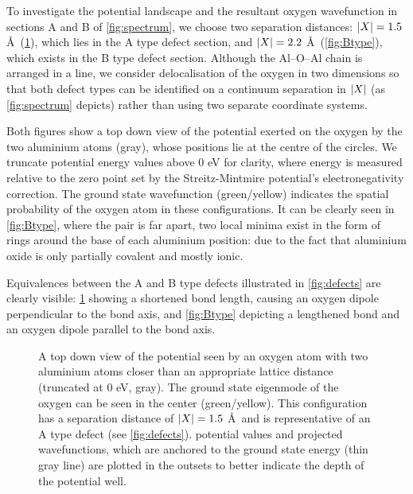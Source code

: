 To investigate the potential landscape and the resultant oxygen wavefunction in sections A and B of \cref{fig:spectrum}, we choose two separation distances: $\lvert X\rvert = 1.5$ \AA\ (\cref{fig:Atype}), which lies in the A type defect section, and $\lvert X\rvert = 2.2$ \AA\ (\cref{fig:Btype}), which exists in the B type defect section.
Although the Al--O--Al chain is arranged in a line, we consider delocalisation of the oxygen in two dimensions so that both defect types can be identified on a continuum separation in $\lvert X\rvert$ (as \cref{fig:spectrum} depicts) rather than using two separate coordinate systems.

Both figures show a top down view of the potential exerted on the oxygen by the two aluminium atoms (gray), whose positions lie at the centre of the circles.
We truncate potential energy values above $0$ eV for clarity, where energy is measured relative to the zero point set by the Streitz-Mintmire potential's electronegativity correction. The ground state wavefunction (green/yellow) indicates the spatial probability of the oxygen atom in these configurations.
It can be clearly seen in \cref{fig:Btype}, where the pair is far apart, two local minima exist in the form of rings around the base of each aluminium position: due to the fact that aluminium oxide is only partially covalent and mostly ionic.

Equivalences between the A and B type defects illustrated in \cref{fig:defects} are clearly visible: \cref{fig:Atype} showing a shortened bond length, causing an oxygen dipole perpendicular to the bond axis, and \cref{fig:Btype} depicting a lengthened bond and an oxygen dipole parallel to the bond axis.


\begin{figure}[htp]
\resizebox{\textwidth}{!}{}
\caption[A Type Ground State Wavefunction]{\label{fig:Atype}A top down view of the potential seen by an oxygen atom with two aluminium atoms closer than an appropriate lattice distance (truncated at $0$ eV, gray). The ground state eigenmode of the oxygen can be seen in the center (green/yellow). This configuration has a separation distance of $\lvert X\rvert = 1.5$ \AA\ and is representative of an A type defect (see \cref{fig:defects}).  potential values and projected wavefunctions, which are anchored to the ground state energy (thin gray line) are plotted in the outsets to better indicate the depth of the potential well.}
\end{figure}

